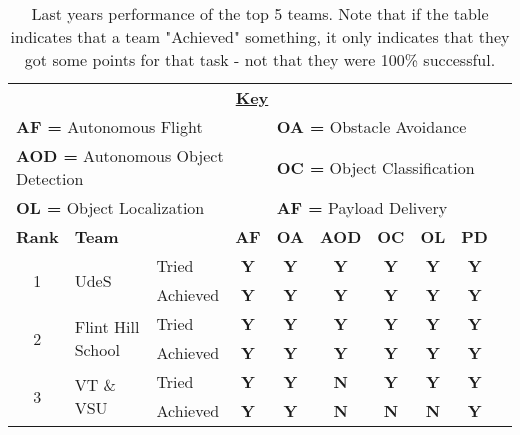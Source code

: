 \documentclass[]{auvsi_doc}
\begin{document}
\begin{table}[h!]
	
	\caption{Last years performance of the top 5 teams. Note that if the table indicates that a team "Achieved" something, it only indicates that they got some points for that task - not that they were 100\% successful.}
	\centering
	\begin{tabular}{ cllccccccc }
		\multicolumn{9}{c}{\textbf{\underline{Key}}} \\
		\multicolumn{4}{l}{\textbf{AF =} Autonomous Flight} & \multicolumn{5}{l}{\textbf{OA =} Obstacle Avoidance} \\
		\multicolumn{4}{l}{\textbf{AOD =} Autonomous Object Detection} & \multicolumn{5}{l}{\textbf{OC =} Object Classification} \\
		\multicolumn{4}{l}{\textbf{OL =} Object Localization} & \multicolumn{5}{l}{\textbf{AF =} Payload Delivery} \\
		\hline
		\textbf{Rank} 	& \textbf{Team} 	&  	& \textbf{AF}  	& \textbf{OA} 	& \textbf{AOD}  	& \textbf{OC} 	& \textbf{OL} 	& \textbf{PD} \\
		\hline
		\multirow{2}{*}{1} 		& \multirow{2}{*}{UdeS} 				& Tried 		& \color{dg}\textbf{Y } 	& \color{dg}\textbf{Y}  	& \color{dg}\textbf{Y} 	& \color{dg}\textbf{Y} 	& \color{dg}\textbf{Y}  	& \color{dg}\textbf{Y}  \\
	 	  					&  								& Achieved	& \color{dg}\textbf{Y} 	& \color{dg}\textbf{Y}  	& \color{dg}\textbf{Y} 	& \color{dg}\textbf{Y} 	& \color{dg}\textbf{Y}  	& \color{dg}\textbf{Y}  \\
		\hline
		\multirow{2}{*}{2} 		& \multirow{2}{*}{Flint Hill School} 		& Tried		& \color{dg}\textbf{Y} 	& \color{dg}\textbf{Y}  	& \color{dg}\textbf{Y} 	& \color{dg}\textbf{Y} 	& \color{dg}\textbf{Y}  	& \color{dg}\textbf{Y}  \\
	 	  					&  								& Achieved	& \color{dg}\textbf{Y} 	& \color{dg}\textbf{Y}  	& \color{dg}\textbf{Y} 	& \color{dg}\textbf{Y} 	& \color{dg}\textbf{Y}  	& \color{dg}\textbf{Y}  \\		
		\hline
		\multirow{2}{*}{3} 		& \multirow{2}{*}{VT \& VSU} 			& Tried		& \color{dg}\textbf{Y} 	& \color{dg}\textbf{Y}  	& \color{red}\textbf{N} 	& \color{dg}\textbf{Y} 	& \color{dg}\textbf{Y}  	& \color{dg}\textbf{Y}  \\	 	  							&  								& Achieved	& \color{dg}\textbf{Y} 	& \color{dg}\textbf{Y}  	& \color{red}\textbf{N} 	& \color{red}\textbf{N} 	& \color{red}\textbf{N}  	& \color{dg}\textbf{Y}  \\		

\end{tabular}
\end{table}
\end{document}
